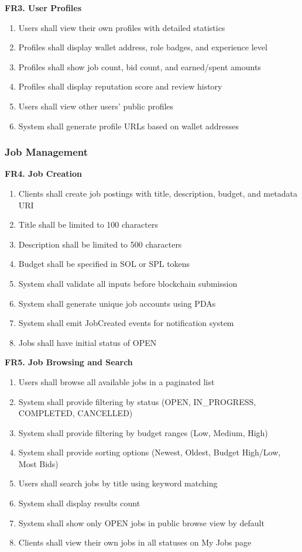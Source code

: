 \documentclass[a4paper,13pt,twoside]{report}
\theoremstyle{definition}
\begin{document}
\textbf{FR3. User Profiles}

\begin{enumerate}
    \item Users shall view their own profiles with detailed statistics
    \item Profiles shall display wallet address, role badges, and experience level
    \item Profiles shall show job count, bid count, and earned/spent amounts
    \item Profiles shall display reputation score and review history
    \item Users shall view other users' public profiles
    \item System shall generate profile URLs based on wallet addresses
\end{enumerate}

\subsubsection{Job Management}

\textbf{FR4. Job Creation}

\begin{enumerate}
    \item Clients shall create job postings with title, description, budget, and metadata URI
    \item Title shall be limited to 100 characters
    \item Description shall be limited to 500 characters
    \item Budget shall be specified in SOL or SPL tokens
    \item System shall validate all inputs before blockchain submission
    \item System shall generate unique job accounts using PDAs
    \item System shall emit JobCreated events for notification system
    \item Jobs shall have initial status of OPEN
\end{enumerate}

\textbf{FR5. Job Browsing and Search}

\begin{enumerate}
    \item Users shall browse all available jobs in a paginated list
    \item System shall provide filtering by status (OPEN, IN\_PROGRESS, COMPLETED, CANCELLED)
    \item System shall provide filtering by budget ranges (Low, Medium, High)
    \item System shall provide sorting options (Newest, Oldest, Budget High/Low, Most Bids)
    \item Users shall search jobs by title using keyword matching
    \item System shall display results count
    \item System shall show only OPEN jobs in public browse view by default
    \item Clients shall view their own jobs in all statuses on My Jobs page
\end{enumerate}
\end{document}
